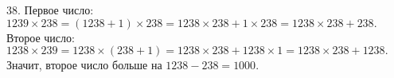 38. Первое число:$1239\times238=(1238+1)\times238=1238\times238+1\times238=1238\times238+238.$ Второе число: $1238\times239=1238\times(238+1)=1238\times238+1238\times1=1238\times238+1238.$ Значит, второе число больше на $1238-238=1000.$\\

